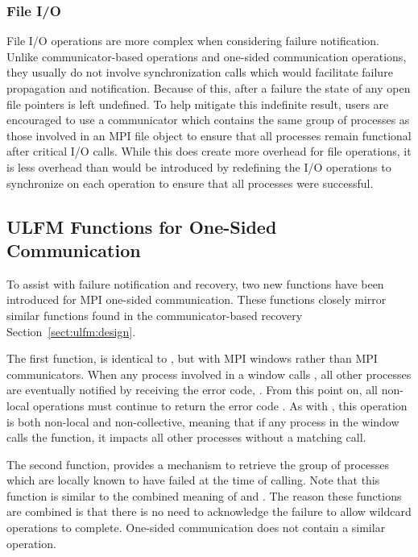 \subsubsection{File I/O}

File I/O operations are more complex when considering failure notification. 
Unlike communicator-based operations and one-sided communication operations, 
they usually do not involve synchronization calls which would facilitate failure 
propagation and notification. Because of this, after a failure the state of any 
open file pointers is left undefined. To help mitigate this indefinite result, 
users are encouraged to use a communicator which contains the same group of 
processes as those involved in an MPI file object to ensure that all processes 
remain functional after critical I/O calls. While this does create more overhead 
for file operations, it is less overhead than would be introduced by redefining 
the I/O operations to synchronize on each operation to ensure that all processes 
were successful.

\subsection{ULFM Functions for One-Sided Communication}
\label{subsec:ulfm:beyond:rma}

To assist with failure notification and recovery, two new functions have been
introduced for MPI one-sided communication. These functions closely mirror 
similar functions found in the communicator-based recovery 
Section~\ref{sect:ulfm:design}. 

The first function,  is
identical to , but with MPI windows rather than MPI
communicators. When any process involved in a window calls ,
all other processes are eventually notified by receiving the error code,
. From this point on, all non-local operations
must continue to return the error code . As with
, this operation is both non-local and non-collective, 
meaning that if any process in the window calls the function, it impacts all other
processes without a matching call.

The second function,  provides a mechanism to
retrieve the group of processes which are locally known to have failed at the 
time of calling. Note that this function is similar to the combined meaning of
 and .
The reason these functions are combined is that there is no need to acknowledge
the failure to allow wildcard operations to complete. One-sided communication
does not contain a similar operation.

